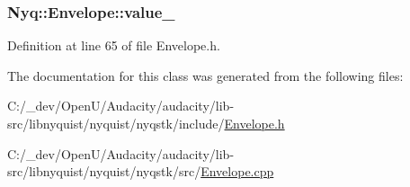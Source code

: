\subsubsection[{\texorpdfstring{value\+\_\+}{value_}}]{ Nyq\+::\+Envelope\+::value\+\_\+\hspace{0.3cm}{\ttfamily [protected]}}\hypertarget{class_nyq_1_1_envelope_ace85116d10e34e4b60219ade97c078f1}{}\label{class_nyq_1_1_envelope_ace85116d10e34e4b60219ade97c078f1}


Definition at line 65 of file Envelope.\+h.



The documentation for this class was generated from the following files\+:\begin{DoxyCompactItemize}
\item 
C\+:/\+\_\+dev/\+Open\+U/\+Audacity/audacity/lib-\/src/libnyquist/nyquist/nyqstk/include/\hyperlink{lib-src_2libnyquist_2nyquist_2nyqstk_2include_2_envelope_8h}{Envelope.\+h}\item 
C\+:/\+\_\+dev/\+Open\+U/\+Audacity/audacity/lib-\/src/libnyquist/nyquist/nyqstk/src/\hyperlink{lib-src_2libnyquist_2nyquist_2nyqstk_2src_2_envelope_8cpp}{Envelope.\+cpp}\end{DoxyCompactItemize}
